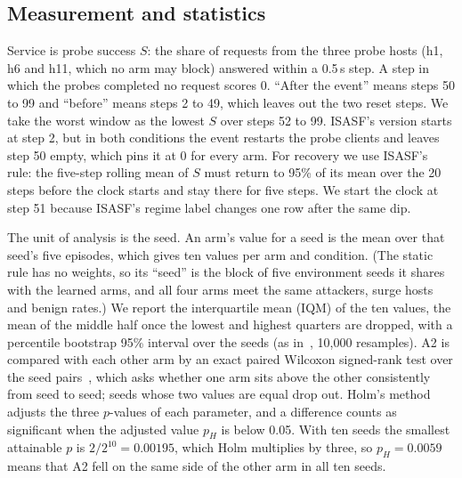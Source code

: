 
\subsection{Measurement and statistics}\label{sec:stats}

Service is probe success $S$: the share of requests from the three probe hosts (h1, h6 and h11, which no arm may block) answered within a 0.5\,s step. A step in which the probes completed no request scores 0. ``After the event'' means steps 50 to 99 and ``before'' means steps 2 to 49, which leaves out the two reset steps. We take the worst window as the lowest $S$ over steps 52 to 99. ISASF's version starts at step 2, but in both conditions the event restarts the probe clients and leaves step 50 empty, which pins it at 0 for every arm. For recovery we use ISASF's rule: the five-step rolling mean of $S$ must return to 95\% of its mean over the 20 steps before the clock starts and stay there for five steps. We start the clock at step 51 because ISASF's regime label changes one row after the same dip.

The unit of analysis is the seed. An arm's value for a seed is the mean over that seed's five episodes, which gives ten values per arm and condition. (The static rule has no weights, so its ``seed'' is the block of five environment seeds it shares with the learned arms, and all four arms meet the same attackers, surge hosts and benign rates.) We report the interquartile mean (IQM) of the ten values, the mean of the middle half once the lowest and highest quarters are dropped, with a percentile bootstrap 95\% interval over the seeds (as in~\cite{agarwal2021}, 10{,}000 resamples). A2 is compared with each other arm by an exact paired Wilcoxon signed-rank test over the seed pairs~\cite{wilcoxon1945}, which asks whether one arm sits above the other consistently from seed to seed; seeds whose two values are equal drop out. Holm's method~\cite{holm1979} adjusts the three $p$-values of each parameter, and a difference counts as significant when the adjusted value $p_H$ is below 0.05. With ten seeds the smallest attainable $p$ is $2/2^{10}=0.00195$, which Holm multiplies by three, so $p_H=0.0059$ means that A2 fell on the same side of the other arm in all ten seeds.
